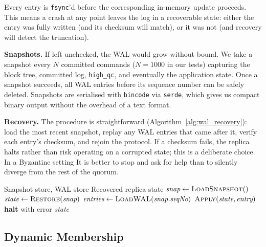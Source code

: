 \documentclass{SVProc}
\begin{document}
Every entry is \texttt{fsync}'d before the corresponding in-memory update proceeds. This means a crash at any point leaves the log in a recoverable state: either the entry was fully written (and its checksum will match), or it was not (and recovery will detect the truncation).

\smallskip\noindent\textbf{Snapshots.}\quad
If left unchecked, the WAL would grow without bound. We take a snapshot every $N$ committed commands ($N{=}1000$ in our tests) capturing the block tree, committed log, \texttt{high\_qc}, and eventually the application state. Once a snapshot succeeds, all WAL entries before its sequence number can be safely deleted.  Snapshots are serialised with \texttt{bincode} via \texttt{serde}, which gives us compact binary output without the overhead of a text format.

\smallskip\noindent\textbf{Recovery.}\quad
The procedure is straightforward (Algorithm~\ref{alg:wal_recovery}): load the most recent snapshot, replay any WAL entries that came after it, verify each entry's checksum, and rejoin the protocol. If a checksum fails, the replica halts rather than risk operating on a corrupted state; this is a deliberate choice. In a Byzantine setting
It is better to stop and ask for help than to silently diverge from the rest of the quorum.

\begin{algorithm}[t]
\caption{Recovery from snapshot + WAL}
\label{alg:wal_recovery}
\begin{algorithmic}[1]
\REQUIRE Snapshot store, WAL store
\ENSURE Recovered replica state
    \STATE $\textit{snap} \gets \textsc{LoadSnapshot}()$
    \STATE $\textit{state} \gets \textsc{Restore}(\textit{snap})$
    \STATE $\textit{entries} \gets \textsc{LoadWAL}(\textit{snap.seqNo})$
            \STATE $\textsc{Apply}(\textit{state}, \textit{entry})$
        \ELSE
            \STATE \textbf{halt} with error
        \ENDIF
    \ENDFOR
    \RETURN \textit{state}
\end{algorithmic}
\end{algorithm}

\subsection{Dynamic Membership}
\label{sec:membership}
\end{document}
